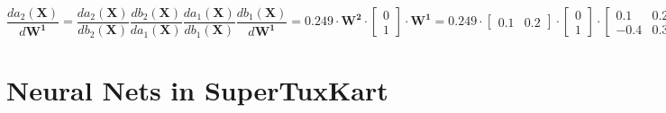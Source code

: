 \documentclass{article}
\begin{document}
    	$$\dfrac{da_2(\boldsymbol{X})}{d\boldsymbol{W^1}}=
    	\dfrac{da_2(\boldsymbol{X})}{db_2(\boldsymbol{X})}\dfrac{db_2(\boldsymbol{X})}{da_1(\boldsymbol{X})}\dfrac{da_1(\boldsymbol{X})}{db_1(\boldsymbol{X})}\dfrac{db_1(\boldsymbol{X})}{d\boldsymbol{W^1}}=
    	0.249\cdot\boldsymbol{W^2}\cdot\begin{bmatrix}0\\1\end{bmatrix}\cdot\boldsymbol{W^1}=0.249\cdot\begin{bmatrix}0.1&0.2\end{bmatrix}\cdot\begin{bmatrix}0\\1\end{bmatrix}\cdot\begin{bmatrix}0.1 & 0.2\\-0.4 & 0.3\end{bmatrix}=\begin{bmatrix}0.005 & 0.01\\-0.02 & 0.015\end{bmatrix}$$
    	$$$$
			
        
    \section{Neural Nets in SuperTuxKart}
       
\end{document}
